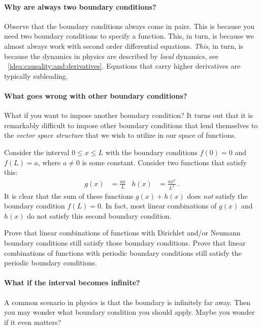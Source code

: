 \paragraph{Why are always two boundary conditions?} Observe that the boundary conditions always come in pairs. This is because you need two boundary conditions to specify a function. This, in turn, is because we almost always work with second order differential equations. \emph{This}, in turn, is because the dynamics in physics are described by \emph{local} dynamics, see \bigidearef{}~\ref{idea:causality:and:derivatives}. Equations that carry higher derivatives are typically subleading.

\paragraph{What goes wrong with other boundary conditions?}
% 
What if you want to impose another boundary condition? It turns out that it is remarkably difficult to impose other boundary conditions that lend themselves to the \emph{vector space structure} that we wish to utilize in our space of functions.

\begin{example}
Consider the interval $0\leq x \leq L$ with the boundary conditions $f(0)=0$ and $f(L)=a$, where $a\neq 0$ is some constant. Consider two functions that satisfy this:
\begin{align}
    g(x) &= \frac{ax}{L}
    &
    h(x) &= \frac{ax^2}{L^2} \ .
\end{align}
It is clear that the sum of these functions $g(x)+h(x)$ does \emph{not} satisfy the boundary condition $f(L)=0$. In fact, most linear combinations of $g(x)$ and $h(x)$ do not satisfy this second boundary condition.
\end{example}
\begin{exercise}
Prove that linear combinations of functions with Dirichlet and/or Neumann boundary conditions still satisfy those boundary conditions. Prove that linear combinations of functions with periodic boundary conditions still satisfy the periodic boundary conditions.
\end{exercise}

\paragraph{What if the interval becomes infinite?}
A common scenario in physics is that the boundary is infinitely far away. Then you may wonder what boundary condition you should apply. Maybe you wonder if it even matters?

